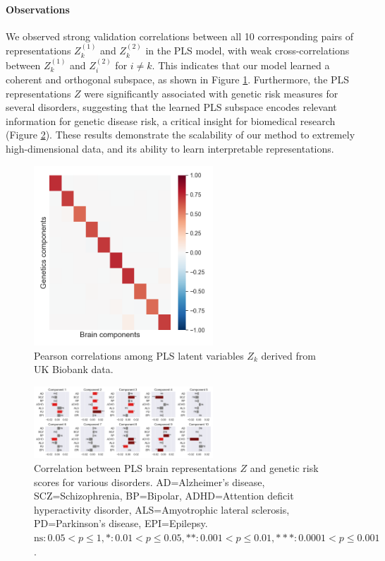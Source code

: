 \paragraph{Observations}
We observed strong validation correlations between all 10 corresponding pairs of representations \( Z^{(1)}_k \) and \( Z^{(2)}_k \) in the PLS model, with weak cross-correlations between \( Z^{(1)}_k \) and \( Z^{(2)}_i \) for \( i \neq k \). This indicates that our model learned a coherent and orthogonal subspace, as shown in Figure \ref{fig:UKBB_corr}. Furthermore, the PLS representations \( Z \) were significantly associated with genetic risk measures for several disorders, suggesting that the learned PLS subspace encodes relevant information for genetic disease risk, a critical insight for biomedical research (Figure \ref{fig:genetic_risk}). These results demonstrate the scalability of our method to extremely high-dimensional data, and its ability to learn interpretable representations.

\begin{figure}
    \centering
    \includegraphics[width=0.6\textwidth,trim={0.8cm 0cm 0.3cm 0cm}]{figures/UKBB/cross_corr.png}
    \caption{Pearson correlations among PLS latent variables \( Z_k \) derived from UK Biobank data.}
    \label{fig:UKBB_corr}
\end{figure}

\begin{figure}
    \centering
    \includegraphics[width=0.6\textwidth,trim={0.5cm 0cm 0.7cm 0cm}]{figures/UKBB/prs_correlations.png}
    \caption{Correlation between PLS brain representations \( Z \) and genetic risk scores for various disorders. AD=Alzheimer's disease, SCZ=Schizophrenia, BP=Bipolar, ADHD=Attention deficit hyperactivity disorder, ALS=Amyotrophic lateral sclerosis, PD=Parkinson's disease, EPI=Epilepsy. $\text{ns}: 0.05< p \leq 1, \ast: 0.01< p \leq 0.05, \ast\ast: 0.001< p \leq 0.01, \ast\ast\ast: 0.0001< p \leq 0.001$.}
    \label{fig:genetic_risk}
\end{figure}


